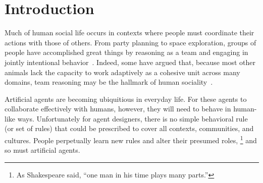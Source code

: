 \section{Introduction}
\label{sec:intro}

Much of human social life occurs in contexts where people must
coordinate their actions with those of others.  From party planning to space exploration,
groups of people have accomplished
great things by reasoning as a team and engaging in jointly
intentional behavior~\cite{searle1995construction}.  Indeed, some have
argued that, because most other animals lack the capacity to work
adaptively as a cohesive unit across many domains, team reasoning may be
the hallmark of human sociality~\cite{tomasello2005understanding}.


Artificial agents are becoming ubiquitious in everyday life.  For
these agents to collaborate effectively with humans, however, they will
need to behave in human-like ways.  Unfortunately for agent designers,
there is no simple behavioral rule (or set of rules) that could be
prescribed to cover all contexts, communities, and cultures.  People
perpetually learn new rules and alter their presumed roles,%
\footnote{As Shakespeare said, ``one man in his time plays many parts.''}
and so must artificial agents.




